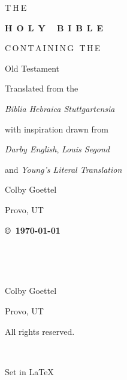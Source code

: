 \begin{titlepage}
    \begin{center}
        {T$\:$H$\:$E}
        
        \vspace{10pt}
        
        {\Huge \textbf{\textsc{H$\;\:$O$\;\:$L$\;\:$Y$\;\:$ $\;\:$B$\;\:$I$\;\:$B$\;\:$L$\;\:$E}}}
        
        \vspace{35pt}
        
        {C$\,$O$\,$N$\,$T$\,$A$\,$I$\,$N$\,$I$\,$N$\,$G$\,$ $\,$T$\,$H$\,$E}
        
        \vspace{10pt}
        
        {\huge Old Testament}
        
        \vspace{100pt}
        
        {Translated from the}
        
        \vspace{5pt}
        
        {\large \emph{Biblia Hebraica Stuttgartensia}}
        
        \vspace{5pt}
        
        {with inspiration drawn from}
        
        \vspace{5pt}
        
        {\emph{Darby English}, \emph{Louis Segond}}
        
        \vspace{5pt}
        
        {and \emph{Young's Literal Translation}}
        
        \vfill
        
        {\large Colby Goettel}
        
        \vspace{2.5pt}
        
        {\small Provo, UT}
    \end{center}

    \clearpage\thispagestyle{empty}
    \begin{multicols}{2}
        {\hfill\textbf{\copyright\ \justtheyear\today}}
        
        ~
        
        ~
        
        Colby Goettel
        
        Provo, UT
        
        All rights reserved.
    \end{multicols}
    
    \vfill
    
    \begin{multicols}{2}
        ~
        
        Set in \LaTeX
    \end{multicols}
\end{titlepage}
